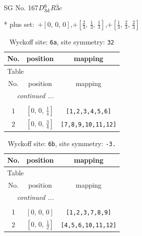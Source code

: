 \documentclass[fleqn,8pt]{jsarticle}
\begin{document}
\setcounter{MaxMatrixCols}{32}

\renewcommand{\tablename}{Table~}
\renewcommand{\figurename}{Figure~}
\begin{center}
\LARGE
SG No. 167\quad$D_{\rm 3d}^{6}$\quad$R\bar{3}c$\quad[ trigonal ]
\end{center}
* plus set:\,\,\,$+\left[ 0,\, 0,\, 0 \right]$,\quad $+\left[ \frac{2}{3},\, \frac{1}{3},\, \frac{1}{3} \right]$,\quad $+\left[ \frac{1}{3},\, \frac{2}{3},\, \frac{2}{3} \right]$
\renewcommand{\arraystretch}{1.2}
\begin{longtable}{ccc}
\caption{Wyckoff site: {\tt 6a}, site symmetry: {\tt 32}}
 \\
 \hline \hline
No. & position & mapping \\ \hline \endfirsthead

\multicolumn{2}{l}{\tablename\ \thetable{}} \\
 \hline \hline
No. & position & mapping \\ \hline \endhead

 \hline \hline
\multicolumn{2}{r}{\footnotesize\it continued ...} \\ \endfoot

 \hline \hline
\multicolumn{2}{r}{} \\ \endlastfoot

1 & $\left[ 0,\, 0,\, \frac{1}{4} \right]$ & {\tt [1,2,3,4,5,6]} \\ \hline
2 & $\left[ 0,\, 0,\, \frac{3}{4} \right]$ & {\tt [7,8,9,10,11,12]} \\
\end{longtable}
\renewcommand{\arraystretch}{1.2}
\begin{longtable}{ccc}
\caption{Wyckoff site: {\tt 6b}, site symmetry: {\tt -3.}}
 \\
 \hline \hline
No. & position & mapping \\ \hline \endfirsthead

\multicolumn{2}{l}{\tablename\ \thetable{}} \\
 \hline \hline
No. & position & mapping \\ \hline \endhead

 \hline \hline
\multicolumn{2}{r}{\footnotesize\it continued ...} \\ \endfoot

 \hline \hline
\multicolumn{2}{r}{} \\ \endlastfoot

1 & $\left[ 0,\, 0,\, 0 \right]$ & {\tt [1,2,3,7,8,9]} \\ \hline
2 & $\left[ 0,\, 0,\, \frac{1}{2} \right]$ & {\tt [4,5,6,10,11,12]} \\
\end{longtable}
\end{document}
